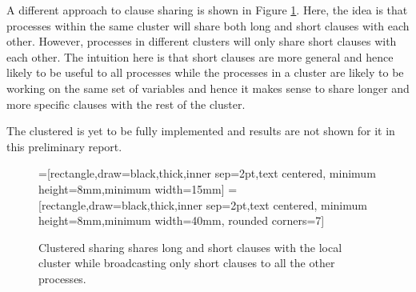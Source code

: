 \documentclass[letterpaper, compsoc, conference]{IEEEtran}
\begin{document}
A different approach to clause sharing is shown in Figure \ref{fig:cluster}.
Here, the idea is that processes within the same cluster will share both long
and short clauses with each other. However, processes in different clusters
will only share short clauses with each other. The intuition here is that short
clauses are more general and hence likely to be useful to all processes while
the processes in a cluster are likely to be working on the same set of
variables and hence it makes sense to share longer and more specific clauses
with the rest of the cluster.

The clustered is yet to be fully implemented and results are not shown for it
in this preliminary report.
\begin{figure}[htbp]
    =[rectangle,draw=black,thick,inner sep=2pt,text centered,
                     minimum height=8mm,minimum width=15mm]
    =[rectangle,draw=black,thick,inner sep=2pt,text centered,
                        minimum height=8mm,minimum width=40mm, rounded corners=7]
    \begin{center}
    \end{center}
    \caption{Clustered sharing shares long and short clauses with the local cluster 
             while broadcasting only short clauses to all the other processes.}
    \label{fig:cluster}
 \end{figure}
\end{document}
